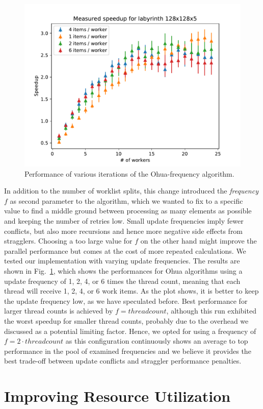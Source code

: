 \begin{figure}
    \centering
    \includegraphics[width=.5\textwidth,keepaspectratio]{gfx/preliminaries-labyrinth/freq-128x128x5}
    \caption{Performance of various iterations of the Ohua-frequency algorithm.}%
    \label{fig:preliminaries:frequencies}
\end{figure}

In addition to the number of worklist splits, this change introduced the \emph{frequency} $f$ as second parameter to the algorithm, which we wanted to fix to a specific value to find a middle ground between processing as many elements as possible and keeping the number of retries low.
Small update frequencies imply fewer conflicts, but also more recursions and hence more negative side effects from stragglers.
Choosing a too large value for $f$ on the other hand might improve the parallel performance but comes at the cost of more repeated calculations.
We tested our implementation with varying update frequencies.
The results are shown in Fig.~\ref{fig:preliminaries:frequencies}, which shows the performances for Ohua algorithms using a update frequency of 1, 2, 4, or 6 times the thread count, meaning that each thread will receive 1, 2, 4, or 6 work items.
As the plot shows, it is better to keep the update frequency low, as we have speculated before.
Best performance for larger thread counts is achieved by $f = threadcount$, although this run exhibited the worst speedup for smaller thread counts, probably due to the overhead we discussed as a potential limiting factor.
Hence, we opted for using a frequency of $f = 2 \cdot threadcount$ as this configuration continuously shows an average to top performance in the pool of examined frequencies and we believe it provides the best trade-off between update conflicts and straggler performance penalties.


\section{Improving Resource Utilization}
\label{sec:preliminaries:futures}

